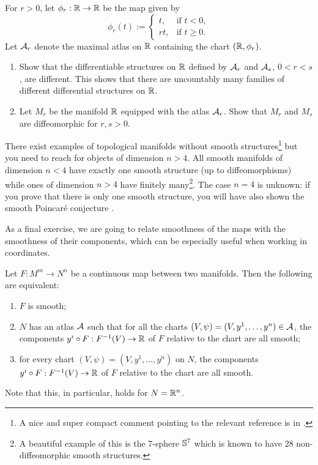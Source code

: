 \begin{exercise}
	For $r>0$, let $\phi_r:\mathbb{R}\to\mathbb{R}$ be the map given by
	\begin{equation}
		\phi_r(t) := \begin{cases}
			t,  & \mbox{if } t<0,    \\
			rt, & \mbox{if } t\geq0.
		\end{cases}
	\end{equation}
	Let $\mathcal{A}_r$ denote the maximal atlas on $\mathbb{R}$ containing the chart $(\mathbb{R}, \phi_r)$.
	\begin{enumerate}
		\item Show that the differentiable structures on $\mathbb{R}$ defined by $\mathcal{A}_r$ and $\mathcal{A}_s$, $0<r<s$, are different.
		      This shows that there are uncountably many families of different differential structures on $\mathbb{R}$.
		\item Let $M_r$ be the manifold $\mathbb{R}$ equipped with the atlas $\mathcal{A}_r$.
		      Show that $M_r$ and $M_s$ are diffeomorphic for $r,s >0$.
	\end{enumerate}
\end{exercise}

\begin{remark}\label{remark:smoothstr}
	There exist examples of topological manifolds without smooth structures\footnote{A nice and super compact comment pointing to the relevant reference is in \cite{SE2691140}.} but you need to reach for objects of dimension $n > 4$.
	All smooth manifolds of dimension $n < 4$ have exactly one smooth structure (up to diffeomorphisms) while ones of dimension $n > 4$ have finitely many\footnote{A beautiful example of this is the $7$-sphere $\mathbb{S}^7$ which is known to have 28 non-diffeomorphic smooth structures.}.
	The case $n = 4$ is unknown: if you prove that there is only one smooth structure, you will have also shown the smooth Poincar\'e conjecture \cite{notes:calegari, article:quanta:topology}.
\end{remark}

As a final exercise, we are going to relate smoothness of the maps with the smoothness of their components, which can be especially useful when working in coordinates.

\begin{exercise}
	Let $F: M^m \to N^n$ be a continuous map between two manifolds. Then the following are equivalent:
	\begin{enumerate}
		\item $F$ is smooth;
		\item $N$ has an atlas $\mathcal{A}$ such that for all the charts $(V, \psi) = (V, y^1, \ldots, y^n)\in \mathcal{A}$, the components $y^i \circ F: F^{-1}(V) \to \mathbb{R}$ of $F$ relative to the chart are all smooth;
		\item for every chart $(V, \psi) = (V, y^1, \ldots, y^n)$ on $N$, the components $y^i \circ F: F^{-1}(V) \to \mathbb{R}$ of $F$ relative to the chart are all smooth.
	\end{enumerate}
	Note that this, in particular, holds for $N=\mathbb{R}^n$.
\end{exercise}

